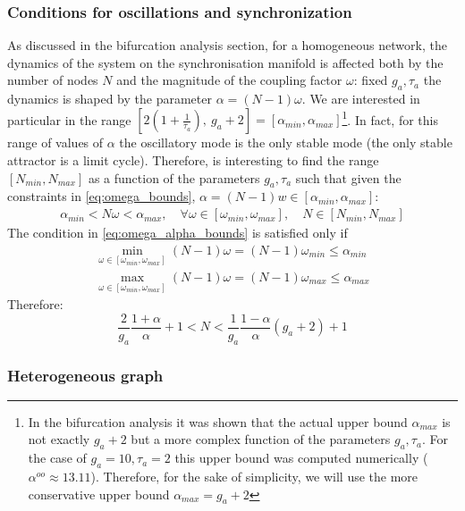\subsubsection{Conditions for oscillations and synchronization}
As discussed in the bifurcation analysis section, for a homogeneous network, the dynamics of the system on the synchronisation manifold is affected both by the number of nodes $N$ and the magnitude of the coupling factor $\omega$: fixed $g_a, \tau_a$ the dynamics is shaped by the parameter $\alpha = (N-1)\omega$. We are interested in particular in the range $\left[2\left(1+\frac{1}{\tau_a}\right),\ g_a + 2\right] = [\alpha_{min}, \alpha_{max}]$\footnote{In the bifurcation analysis it was shown that the actual upper bound $\alpha_{max}$ is not exactly $g_a+2$ but a more complex function of the parameters $g_a, \tau_a$. For the case of $g_a =10, \tau_a=2$ this upper bound was computed numerically ($\alpha^{oo}\approx 13.11$). Therefore, for the sake of simplicity, we will use the more conservative upper bound $\alpha_{max}=g_a+2$}. In fact, for this range of values of $\alpha$ the oscillatory mode is the only stable mode (the only stable attractor is a limit cycle). Therefore, is interesting to find the range $[N_{min}, N_{max}]$ as a function of the parameters $g_a, \tau_a$ such that given the constraints in \cref{eq:omega_bounds}, $\alpha = (N-1)w \in [\alpha_{min}, \alpha_{max}]$:
\begin{equation} 
\begin{aligned}
\alpha_{min} < N \omega < \alpha_{max}, \quad \forall \omega \in [\omega_{min}, \omega_{max}], \quad N \in [N_{min}, N_{max}]
\end{aligned}
\label{eq:omega_alpha_bounds}
\end{equation}
The condition in \cref{eq:omega_alpha_bounds} is satisfied only if 
\begin{equation} 
\begin{aligned}
\min\limits_{\omega \in [\omega_{min}, \omega_{max}] }(N-1)\omega= (N-1)\omega_{min} \leq \alpha_{min} \\
\max\limits_{\omega \in [\omega_{min}, \omega_{max}] }(N-1)\omega = (N-1)\omega_{max} \leq \alpha_{max} 
\end{aligned}
\label{eq:omega_alpha_bounds}
\end{equation}
Therefore:
\begin{equation}
\frac{2}{g_a} \frac{1 + \alpha}{\alpha} + 1< N < \frac{1}{g_a} \frac{1 - \alpha}{\alpha}(g_a + 2) + 1
\label{eq:n_constraints}
\end{equation}
 


\subsubsection{Heterogeneous graph}